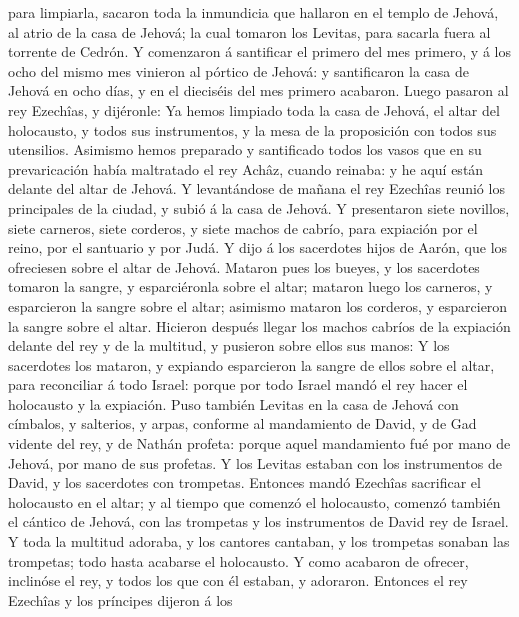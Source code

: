 para limpiarla, sacaron toda la inmundicia que hallaron en el templo de
Jehová, al atrio de la casa de Jehová; la cual tomaron los Levitas, para
sacarla fuera al torrente de Cedrón.  Y comenzaron á
santificar el primero del mes primero, y á los ocho del mismo mes
vinieron al pórtico de Jehová: y santificaron la casa de Jehová en ocho
días, y en el dieciséis del mes primero acabaron.  Luego
pasaron al rey Ezechîas, y dijéronle: Ya hemos limpiado toda la casa de
Jehová, el altar del holocausto, y todos sus instrumentos, y la mesa de
la proposición con todos sus utensilios.  Asimismo hemos
preparado y santificado todos los vasos que en su prevaricación había
maltratado el rey Achâz, cuando reinaba: y he aquí están delante del
altar de Jehová.  Y levantándose de mañana el rey
Ezechîas reunió los principales de la ciudad, y subió á la casa de
Jehová.  Y presentaron siete novillos, siete carneros,
siete corderos, y siete machos de cabrío, para expiación por el reino,
por el santuario y por Judá. Y dijo á los sacerdotes hijos de Aarón, que
los ofreciesen sobre el altar de Jehová.  Mataron pues
los bueyes, y los sacerdotes tomaron la sangre, y esparciéronla sobre el
altar; mataron luego los carneros, y esparcieron la sangre sobre el
altar; asimismo mataron los corderos, y esparcieron la sangre sobre el
altar.  Hicieron después llegar los machos cabríos de la
expiación delante del rey y de la multitud, y pusieron sobre ellos sus
manos:  Y los sacerdotes los mataron, y expiando
esparcieron la sangre de ellos sobre el altar, para reconciliar á todo
Israel: porque por todo Israel mandó el rey hacer el holocausto y la
expiación.  Puso también Levitas en la casa de Jehová con
címbalos, y salterios, y arpas, conforme al mandamiento de David, y de
Gad vidente del rey, y de Nathán profeta: porque aquel mandamiento fué
por mano de Jehová, por mano de sus profetas.  Y los
Levitas estaban con los instrumentos de David, y los sacerdotes con
trompetas.  Entonces mandó Ezechîas sacrificar el
holocausto en el altar; y al tiempo que comenzó el holocausto, comenzó
también el cántico de Jehová, con las trompetas y los instrumentos de
David rey de Israel.  Y toda la multitud adoraba, y los
cantores cantaban, y los trompetas sonaban las trompetas; todo hasta
acabarse el holocausto.  Y como acabaron de ofrecer,
inclinóse el rey, y todos los que con él estaban, y adoraron.
 Entonces el rey Ezechîas y los príncipes dijeron á los
